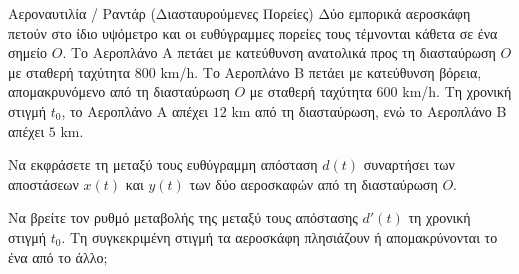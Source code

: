 \begin{problhma}{Αεροναυτιλία / Ραντάρ (Διασταυρούμενες Πορείες)}
Δύο εμπορικά αεροσκάφη πετούν στο ίδιο υψόμετρο και οι ευθύγραμμες πορείες τους τέμνονται κάθετα σε ένα σημείο $O$. Το Αεροπλάνο Α πετάει με κατεύθυνση ανατολικά προς τη διασταύρωση $O$ με σταθερή ταχύτητα $800$ \si{km/h}. Το Αεροπλάνο Β πετάει με κατεύθυνση βόρεια, απομακρυνόμενο από τη διασταύρωση $O$ με σταθερή ταχύτητα $600$ \si{km/h}.
Τη χρονική στιγμή $t_0$, το Αεροπλάνο Α απέχει $12$ \si{km} από τη διασταύρωση, ενώ το Αεροπλάνο Β απέχει $5$ \si{km}.
\begin{alist}
\item Να εκφράσετε τη μεταξύ τους ευθύγραμμη απόσταση $d(t)$ συναρτήσει των αποστάσεων $x(t)$ και $y(t)$ των δύο αεροσκαφών από τη διασταύρωση $O$.
\item Να βρείτε τον ρυθμό μεταβολής της μεταξύ τους απόστασης $d'(t)$ τη χρονική στιγμή $t_0$. Τη συγκεκριμένη στιγμή τα αεροσκάφη πλησιάζουν ή απομακρύνονται το ένα από το άλλο;
\end{alist}

\begin{center}
\end{center}
\end{problhma}
